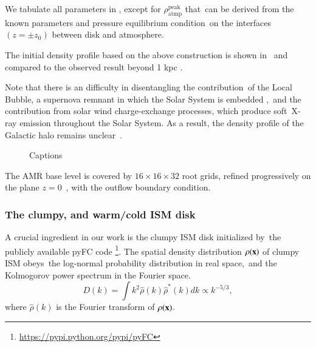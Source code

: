 \documentclass[twocolumn]{aastex631}
\begin{document}
  We tabulate all parameters in , except for $\rho_{\text{atmp}}^{\text{peak}}$ that\
  can be derived from the known parameters and pressure equilibrium condition\
  on the interfaces $(z=\pm z_{0})$ between disk and atmosphere.\

  The initial density profile based on the above construction is shown in \
  and compared to the observed result beyond 1 kpc \citep{Miller_2013}.\

  Note that there is an difficulty in disentangling the contribution\
  of the Local Bubble, a supernova remnant in which the Solar System is embedded \citep{Snowden1990},\
  and the contribution from solar wind charge-exchange processes, which produce soft\
  X-ray emission throughout the Solar System. As a result, the density profile of the Galactic halo remains unclear\
  \citep{BlandHawthorn2016}.


  \begin{figure}[h]
  \caption{Captions}
  \end{figure}


  The AMR base level is covered by $16\times16\times32$ root grids, refined progressively on the plane $z=0$\
  , with the outflow boundary condition.


  \subsubsection{The clumpy, and warm/cold ISM disk}

  A crucial ingredient in our work is the clumpy ISM disk initialized by\
  the publicly available pyFC code
  \footnote{\url{https://pypi.python.org/pypi/pyFC}}.
  The spatial density distribution $\rho(\bold{x})$ of clumpy ISM obeys\
  the log-normal probability distribution in real space,\
  and the Kolmogorov power spectrum in the Fourier space.
  \begin{equation}
    D(k)=\int k^{2} \hat{\rho}(k)\hat{\rho}^{*}(k)dk \propto k^{-5/3},
  \end{equation}
  where $\hat{\rho}(k)$ is the Fourier transform of $\rho(\bold{x})$.
\end{document}

